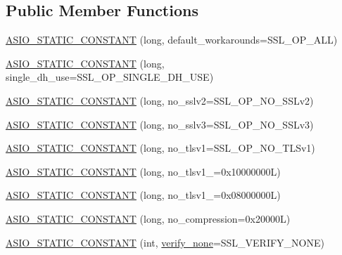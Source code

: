 \subsection*{Public Member Functions}
\begin{DoxyCompactItemize}
\item 
\hyperlink{classasio_1_1ssl_1_1context__base_a1cf38340aceb9f6b87937117628139e8}{A\+S\+I\+O\+\_\+\+S\+T\+A\+T\+I\+C\+\_\+\+C\+O\+N\+S\+T\+A\+N\+T} (long, default\+\_\+workarounds=S\+S\+L\+\_\+\+O\+P\+\_\+\+A\+L\+L)
\item 
\hyperlink{classasio_1_1ssl_1_1context__base_a57673d9d613730c2ca29720922c47925}{A\+S\+I\+O\+\_\+\+S\+T\+A\+T\+I\+C\+\_\+\+C\+O\+N\+S\+T\+A\+N\+T} (long, single\+\_\+dh\+\_\+use=S\+S\+L\+\_\+\+O\+P\+\_\+\+S\+I\+N\+G\+L\+E\+\_\+\+D\+H\+\_\+\+U\+S\+E)
\item 
\hyperlink{classasio_1_1ssl_1_1context__base_a3ce9ae7ac2488c04d55e8bd686261b13}{A\+S\+I\+O\+\_\+\+S\+T\+A\+T\+I\+C\+\_\+\+C\+O\+N\+S\+T\+A\+N\+T} (long, no\+\_\+sslv2=S\+S\+L\+\_\+\+O\+P\+\_\+\+N\+O\+\_\+\+S\+S\+Lv2)
\item 
\hyperlink{classasio_1_1ssl_1_1context__base_a176c285e905b2eed6adcac708d72513d}{A\+S\+I\+O\+\_\+\+S\+T\+A\+T\+I\+C\+\_\+\+C\+O\+N\+S\+T\+A\+N\+T} (long, no\+\_\+sslv3=S\+S\+L\+\_\+\+O\+P\+\_\+\+N\+O\+\_\+\+S\+S\+Lv3)
\item 
\hyperlink{classasio_1_1ssl_1_1context__base_a1727888d0005af81060fd3093975518a}{A\+S\+I\+O\+\_\+\+S\+T\+A\+T\+I\+C\+\_\+\+C\+O\+N\+S\+T\+A\+N\+T} (long, no\+\_\+tlsv1=S\+S\+L\+\_\+\+O\+P\+\_\+\+N\+O\+\_\+\+T\+L\+Sv1)
\item 
\hyperlink{classasio_1_1ssl_1_1context__base_a4ea78671a3d9afdbe550a3bb2cbd4492}{A\+S\+I\+O\+\_\+\+S\+T\+A\+T\+I\+C\+\_\+\+C\+O\+N\+S\+T\+A\+N\+T} (long, no\+\_\+tlsv1\+\_=0x10000000\+L)
\item 
\hyperlink{classasio_1_1ssl_1_1context__base_a374ebcdb768437dfeecfc1b06f97b3be}{A\+S\+I\+O\+\_\+\+S\+T\+A\+T\+I\+C\+\_\+\+C\+O\+N\+S\+T\+A\+N\+T} (long, no\+\_\+tlsv1\+\_=0x08000000\+L)
\item 
\hyperlink{classasio_1_1ssl_1_1context__base_a1bd0fe429c81e6513ae9f31b711fcfc1}{A\+S\+I\+O\+\_\+\+S\+T\+A\+T\+I\+C\+\_\+\+C\+O\+N\+S\+T\+A\+N\+T} (long, no\+\_\+compression=0x20000\+L)
\item 
\hyperlink{classasio_1_1ssl_1_1context__base_aed4dd4c8088b79bb94945ce81a9eb9a6}{A\+S\+I\+O\+\_\+\+S\+T\+A\+T\+I\+C\+\_\+\+C\+O\+N\+S\+T\+A\+N\+T} (int, \hyperlink{namespaceasio_1_1ssl_a4b2056fdb330248b703c81a5458053cd}{verify\+\_\+none}=S\+S\+L\+\_\+\+V\+E\+R\+I\+F\+Y\+\_\+\+N\+O\+N\+E)

\end{DoxyCompactItemize}
